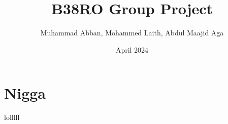 \documentclass{report}
\begin{document}
\title{B38RO Group Project}
\author{Muhammad Abban, Mohammed Laith, Abdul Maajid Aga}
\date{April 2024}
\maketitle

\tableofcontents

\chapter{Nigga}

lolllll
\end{document}
